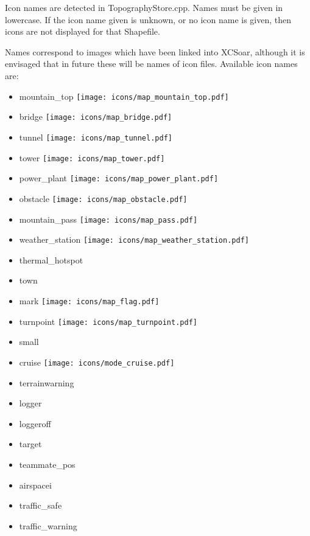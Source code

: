 Icon names are detected in TopographyStore.cpp. Names must be given in lowercase. If the icon name given is unknown, or no icon name is given, then icons are not displayed for that Shapefile.


Names correspond to images which have been linked into XCSoar, although
it is envisaged that in future these will be names of icon files. Available icon names are:
\begin{itemize}
\item mountain\_top \texttt{[image: icons/map\_mountain\_top.pdf]}
\item bridge \texttt{[image: icons/map\_bridge.pdf]}
\item tunnel \texttt{[image: icons/map\_tunnel.pdf]}
\item tower \texttt{[image: icons/map\_tower.pdf]}
\item power\_plant \texttt{[image: icons/map\_power\_plant.pdf]}
\item obstacle \texttt{[image: icons/map\_obstacle.pdf]}
\item mountain\_pass \texttt{[image: icons/map\_pass.pdf]}
\item weather\_station \texttt{[image: icons/map\_weather\_station.pdf]}
\item thermal\_hotspot
\item town
\item mark \texttt{[image: icons/map\_flag.pdf]}
\item turnpoint \texttt{[image: icons/map\_turnpoint.pdf]}
\item small
\item cruise \texttt{[image: icons/mode\_cruise.pdf]}
\item terrainwarning
\item logger
\item loggeroff
\item target
\item teammate\_pos
\item airspacei
\item traffic\_safe
\item traffic\_warning

\end{itemize}
